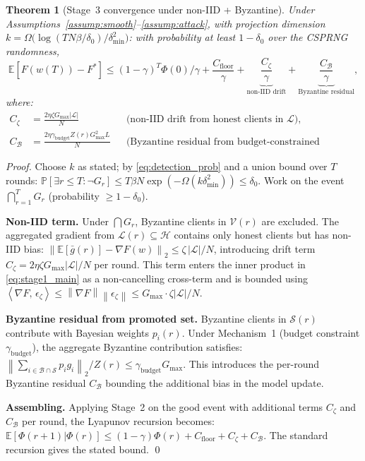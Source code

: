 \documentclass{article}
\newtheorem{theorem}{Theorem}
\newcommand{\E}{\mathbb{E}}
\renewcommand{\Pr}{\mathbb{P}}
\newcommand{\norm}[1]{\left\lVert #1 \right\rVert}
\newcommand{\inner}[2]{\left\langle #1,\, #2 \right\rangle}
\newcommand{\calH}{\mathcal{H}}
\newcommand{\calB}{\mathcal{B}}
\newcommand{\calV}{\mathcal{V}}
\newcommand{\calS}{\mathcal{S}}
\newcommand{\calL}{\mathcal{L}}
\newcommand{\LyapV}{\Phi}
\newcommand{\gF}{\nabla F}
\begin{document}
\begin{theorem}[Stage~3 convergence under non-IID + Byzantine]
\label{thm:stage3}
Under Assumptions~\ref{assump:smooth}--\ref{assump:attack}, with projection
dimension
$k = \Omega\bigl(\log(TN\beta/\delta_0) / \delta_{\min}^2\bigr)$:
with probability at least $1 - \delta_0$ over the CSPRNG randomness,
\[
  \E[F(w(T)) - F^*]
  \leq
  (1-\gamma)^T \LyapV(0) / \gamma
  + \frac{C_{\mathrm{floor}}}{\gamma}
  + \underbrace{\frac{C_\zeta}{\gamma}}_{\text{non-IID drift}}
  + \underbrace{\frac{C_\calB}{\gamma}}_{\text{Byzantine residual}},
\]
where:
\begin{align*}
  C_\zeta &= \frac{2\eta\zeta G_{\max} |\calL|}{N}
  && \text{(non-IID drift from honest clients in } \calL\text{)},\\
  C_\calB &= \frac{2\eta\gamma_{\mathrm{budget}} Z(r) G_{\max}^2 L}{N}
  && \text{(Byzantine residual from budget-constrained promoted set).}
\end{align*}
\end{theorem}

\begin{proof}
Choose $k$ as stated; by \eqref{eq:detection_prob} and a union bound
over $T$ rounds: $\Pr[\exists r \leq T: \neg G_r] \leq T \beta N
\exp(-\Omega(k\delta_{\min}^2)) \leq \delta_0$.
Work on the event $\bigcap_{r=1}^T G_r$ (probability $\geq 1 - \delta_0$).

\textbf{Non-IID term.}
Under $\bigcap G_r$, Byzantine clients in $\calV(r)$ are excluded.
The aggregated gradient from $\calL(r) \subseteq \calH$ contains only honest
clients but has non-IID bias:
$\norm{\E[\bar{g}(r)] - \gF(w)}_2 \leq \zeta\,|\calL|/N$,
introducing drift term $C_\zeta = 2\eta\zeta G_{\max}|\calL|/N$ per round.
This term enters the inner product in \eqref{eq:stage1_main} as a non-cancelling
cross-term and is bounded using $\inner{\gF}{\epsilon_\zeta} \leq \norm{\gF}\norm{\epsilon_\zeta}
\leq G_{\max} \cdot \zeta|\calL|/N$.

\textbf{Byzantine residual from promoted set.}
Byzantine clients in $\calS(r)$ contribute with Bayesian weights $p_i(r)$.
Under Mechanism~1 (budget constraint $\gamma_{\mathrm{budget}}$), the
aggregate Byzantine contribution satisfies:
$\norm{\sum_{i \in \calB \cap \calS} p_i g_i}_2 / Z(r)
\leq \gamma_{\mathrm{budget}} G_{\max}$.
This introduces the per-round Byzantine residual $C_\calB$ bounding the
additional bias in the model update.

\textbf{Assembling.}
Applying Stage~2 on the good event with additional terms $C_\zeta$ and
$C_\calB$ per round, the Lyapunov recursion becomes:
$\E[\LyapV(r+1) | \LyapV(r)] \leq (1-\gamma)\LyapV(r) + C_{\mathrm{floor}} + C_\zeta + C_\calB$.
The standard recursion gives the stated bound.
\qed
\end{proof}
\end{document}
